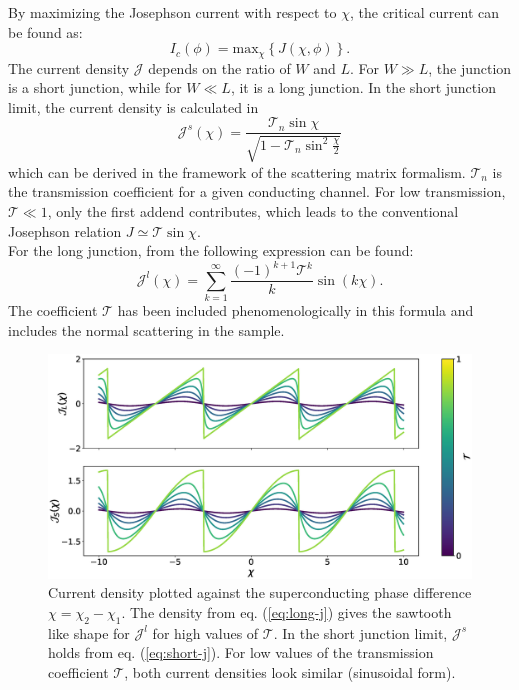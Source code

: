 By maximizing the Josephson current with respect to $\chi$, the critical current can be found as:
\begin{equation}
I_c(\phi) = \text{max}_{\chi}\left\{ J(\chi, \phi) \right\}\label{eq:josephson-relation}.
\end{equation} 
The current density $\mathcal{J}$ depends on the ratio of $W$ and $L$. For $W \gg L$, the junction is a short junction, while for $W \ll L$, it is a long junction. 
In the short junction limit, the current density is calculated in \cite{Beenakker1991}
\begin{equation}
\mathcal{J}^s (\chi) = \frac{\mathcal{T}_n \sin \chi}{\sqrt{1 - \mathcal{T}_n \sin^2 \frac{\chi}{2}}}\label{eq:short-j}
\end{equation}
which can be derived in the framework of the scattering matrix formalism. $\mathcal{T}_n$ is the transmission coefficient for a given conducting channel. For low transmission, $\mathcal{T} \ll 1$, only the first addend contributes, which leads to the conventional Josephson relation $J \simeq \mathcal{T} \sin \chi$.\\
For the long junction, from \cite{Barzykin1999} the following expression can be found:
\begin{equation}
\mathcal{J}^l(\chi) = \sum_{k = 1}^{\infty} \frac{(-1)^{k+1} \mathcal{T}^k}{k} \sin( k \chi).\label{eq:long-j}
\end{equation}
The coefficient $\mathcal{T}$ has been included phenomenologically in this formula and includes the normal scattering in the sample.
\begin{figure}
\centering
\includegraphics[width=\textwidth]{figure/analyticalmodel/current_density_all}
\caption{Current density plotted against the superconducting phase difference $\chi = \chi_2 - \chi_1$. The density from eq. (\ref{eq:long-j}) gives the sawtooth like shape for $\mathcal{J}^l$ for high values of $\mathcal{T}$. In the short junction limit, $\mathcal{J}^s$ holds from eq. (\ref{eq:short-j}). For low values of the transmission coefficient $\mathcal{T}$, both current densities look similar (sinusoidal form). }
\label{fig:current_density}
\end{figure}
